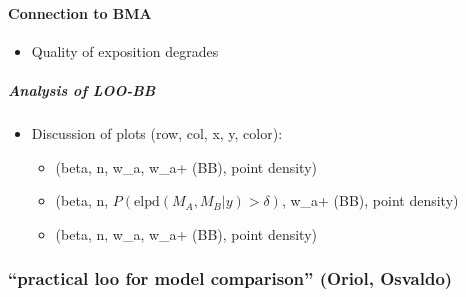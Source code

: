 \hypertarget{connection-to-bma}{%
\paragraph{Connection to BMA}\label{connection-to-bma}}

\begin{itemize}
\tightlist
\item
  Quality of exposition degrades
\end{itemize}

\hypertarget{analysis-of-loo-bb}{%
\subparagraph{Analysis of LOO-BB}\label{analysis-of-loo-bb}}

\begin{itemize}
\tightlist
\item
  Discussion of plots (row, col, x, y, color):

  \begin{itemize}
  \tightlist
  \item
    (beta, n, w\_a, w\_a+ (BB), point density)
  \item
    (beta, n, \(P(\mathrm{elpd}(M_A, M_B | y) > \delta)\), w\_a+ (BB),
    point density)
  \item
    (beta, n, w\_a, w\_a+ (BB), point density)
  \end{itemize}
\end{itemize}

\hypertarget{practical-loo-for-model-comparison-oriol-osvaldo}{%
\subsubsection{``practical loo for model comparison'' (Oriol,
Osvaldo)}\label{practical-loo-for-model-comparison-oriol-osvaldo}}

